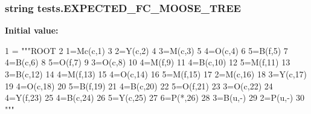 \subsubsection[{E\+X\+P\+E\+C\+T\+E\+D\+\_\+\+F\+C\+\_\+\+M\+O\+O\+S\+E\+\_\+\+T\+R\+E\+E}]{\setlength{\rightskip}{0pt plus 5cm}string tests.\+E\+X\+P\+E\+C\+T\+E\+D\+\_\+\+F\+C\+\_\+\+M\+O\+O\+S\+E\+\_\+\+T\+R\+E\+E}\label{namespacetests_a22847012a44a5628b53cb446b65ae99b}
{\bfseries Initial value\+:}
\begin{DoxyCode}
1 = \textcolor{stringliteral}{"""ROOT}
2 \textcolor{stringliteral}{    1=Mc(c,1)}
3 \textcolor{stringliteral}{        2=Y(c,2)}
4 \textcolor{stringliteral}{            3=M(c,3)}
5 \textcolor{stringliteral}{                4=O(c,4)}
6 \textcolor{stringliteral}{                    5=B(f,5)}
7 \textcolor{stringliteral}{                4=B(c,6)}
8 \textcolor{stringliteral}{                    5=O(f,7)}
9 \textcolor{stringliteral}{            3=O(c,8)}
10 \textcolor{stringliteral}{                4=M(f,9)}
11 \textcolor{stringliteral}{                4=B(c,10)}
12 \textcolor{stringliteral}{                    5=M(f,11)}
13 \textcolor{stringliteral}{            3=B(c,12)}
14 \textcolor{stringliteral}{                4=M(f,13)}
15 \textcolor{stringliteral}{                4=O(c,14)}
16 \textcolor{stringliteral}{                    5=M(f,15)}
17 \textcolor{stringliteral}{        2=M(c,16)}
18 \textcolor{stringliteral}{            3=Y(c,17)}
19 \textcolor{stringliteral}{                4=O(c,18)}
20 \textcolor{stringliteral}{                    5=B(f,19)}
21 \textcolor{stringliteral}{                4=B(c,20)}
22 \textcolor{stringliteral}{                    5=O(f,21)}
23 \textcolor{stringliteral}{            3=O(c,22)}
24 \textcolor{stringliteral}{                4=Y(f,23)}
25 \textcolor{stringliteral}{                4=B(c,24)}
26 \textcolor{stringliteral}{                    5=Y(c,25)}
27 \textcolor{stringliteral}{                        6=P(*,26)}
28 \textcolor{stringliteral}{            3=B(u,-)}
29 \textcolor{stringliteral}{        2=P(u,-)}
30 \textcolor{stringliteral}{"""}
\end{DoxyCode}
\hypertarget{namespacetests_aeb3dec3064640f57137f1a71ca72708d}{}
